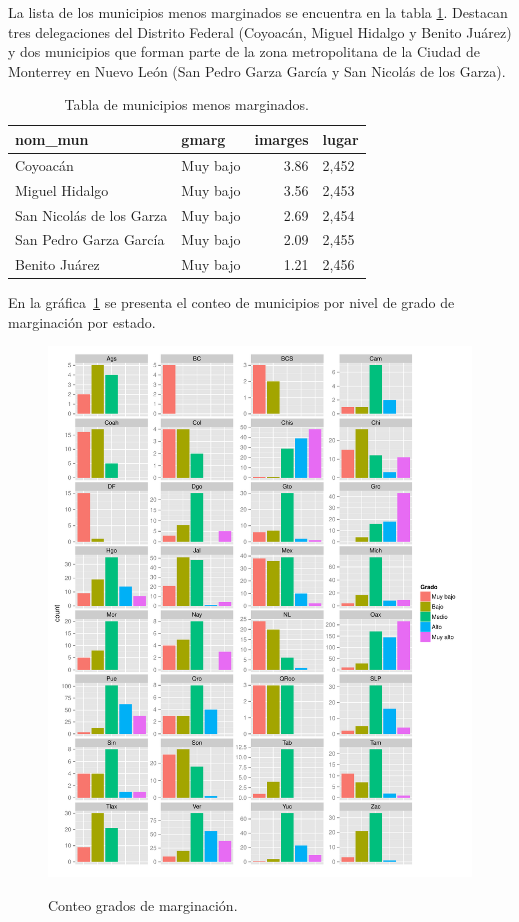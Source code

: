 La lista de los municipios menos marginados se encuentra en la tabla \ref{tab:menosmarg}. Destacan tres delegaciones del Distrito Federal (Coyoacán, Miguel Hidalgo y Benito Juárez)  y dos municipios que forman parte de la zona metropolitana de la Ciudad de Monterrey en Nuevo León (San Pedro Garza García y San Nicolás de los Garza).

\begin{table}[ht]
\centering
\begin{tabular}{llrl}
  \hline
nom\_mun & gmarg & imarges & lugar \\ 
  \hline
  Coyoacán & Muy bajo & 3.86 & 2,452 \\ 
  Miguel Hidalgo & Muy bajo & 3.56 & 2,453 \\   
  San Nicolás de los Garza & Muy bajo & 2.69 & 2,454 \\ 
  San Pedro Garza García & Muy bajo & 2.09 & 2,455 \\
  Benito Juárez & Muy bajo & 1.21 & 2,456 \\ 
  \hline
\end{tabular}
\caption[Municipios menos marginados]
            {Tabla de municipios menos marginados.}
\label{tab:menosmarg}
\end{table}

En la gráfica~\ref{obj:gradosmarg} se presenta el conteo de municipios por nivel de grado de marginación por estado.

\begin{figure}[!ht]
\centering
\includegraphics[width=\textwidth]{./plots/gmarg_plot.pdf} \\
\caption{Conteo grados de marginación.}
\label{obj:gradosmarg}  
\end{figure}

